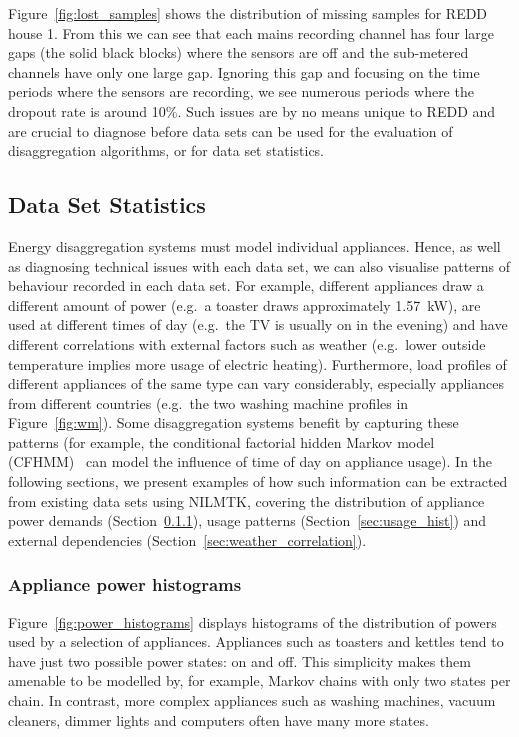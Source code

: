 \documentclass{sig-alternate}
\newcommand{\secref}[1]{Section~\ref{#1}}
\begin{document}
Figure~\ref{fig:lost_samples} shows the distribution of missing
samples for REDD house 1.  From this we can see that each mains
recording channel has four large gaps (the solid black blocks) where
the sensors are off and the sub-metered channels have
only one large gap.  Ignoring this gap and focusing on the time
periods where the sensors are recording, we see numerous periods where
the dropout rate is around 10\%.  Such issues are by no means unique
to REDD and are crucial to diagnose before data sets can be used for
the evaluation of disaggregation algorithms, or for data set
statistics.

\subsection{Data Set Statistics}

Energy disaggregation systems must model individual appliances.  Hence, as well as diagnosing technical issues with each data set, we can also visualise patterns of behaviour recorded in each data set. For example, different appliances draw a different amount of power (e.g.\ a toaster draws approximately 1.57~kW), are used at different times of day (e.g.\ the TV is usually on in the evening) and have different correlations with external factors such as weather (e.g.\ lower outside temperature implies more usage of electric heating). Furthermore, load profiles of different appliances of the same type can vary considerably, especially appliances from different countries (e.g.\ the two washing machine profiles in Figure~\ref{fig:wm}). Some disaggregation systems benefit by capturing these patterns (for example, the conditional factorial hidden Markov model (CFHMM)~\cite{kim_2011} can model the influence of time of day on appliance usage). In the following sections, we present examples of how such information can be extracted from existing data sets using NILMTK, covering the distribution of appliance power demands (\secref{sec:power_hist}), usage patterns (\secref{sec:usage_hist}) and external dependencies (\secref{sec:weather_correlation}).

\subsubsection{Appliance power histograms}
\label{sec:power_hist}

\noindent
Figure~\ref{fig:power_histograms} displays histograms of the
distribution of powers used by a selection of appliances.  Appliances
such as toasters and kettles tend to have just two possible power states:
on and off.  This simplicity makes them amenable to be modelled by,
for example, Markov chains with only two states per chain.  In contrast, more complex appliances
such as washing machines, vacuum cleaners, dimmer lights and computers often
have many more states.
\end{document}
